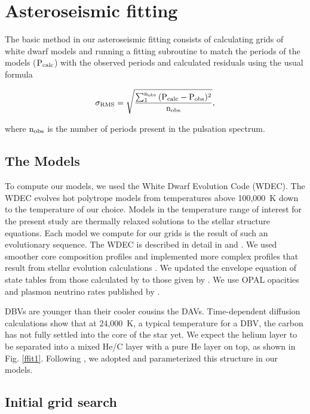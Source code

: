 \documentclass[12pt,preprint]{aastex}
\begin{document}
\section{Asteroseismic fitting}
\label{fitting}

The basic method in our asteroseismic fitting consists of calculating grids of white dwarf models and 
running a fitting subroutine to match the periods of the models ($\rm P_{calc}$) with the observed 
periods and calculated residuals using the usual formula

\begin{equation}
\label{fiteq1}
\rm \sigma_{RMS} = \sqrt{\frac{\sum_{1}^{n_{obs}} {(P_{calc}-P_{obs})^2}}{n_{obs}}},
\end{equation}

\noindent where $\rm n_{obs}$ is the number of periods present in the pulsation spectrum.

\subsection{The Models}
\label{models}

To compute our models, we used the White Dwarf Evolution Code (WDEC). The WDEC evolves hot 
polytrope models from temperatures above 100{,}000~K down to the temperature of our choice. 
Models in the temperature range of interest for the present study are thermally relaxed 
solutions to the stellar structure equations. Each model we compute for our grids is the result 
of such an evolutionary sequence. The WDEC is described in detail in \citet{Lamb75} and 
\citet{Wood90}. We used smoother core composition profiles and implemented more complex profiles 
that result from stellar evolution calculations \citep{Salaris97}. We updated the envelope 
equation of state tables from those calculated by \citet{Fontaine77} to those given by 
\citet{Saumon95}. We use OPAL opacities \citep{Iglesias96} and plasmon neutrino rates 
published by \citet{Itoh96}. 

DBVs are younger than their cooler cousins the DAVs. Time-dependent diffusion calculations 
\citep[e.g.][]{Dehner95,Althaus05} show that at 24{,}000~K, a typical temperature for a DBV, 
the carbon has not fully settled into the core of the star yet. We expect the helium layer to 
be separated into a mixed He/C layer with a pure He layer on top, as shown in Fig. \ref{ffit1}. 
Following  \citet{Metcalfe05a}, we adopted and parameterized this structure in our models. 

\subsection{Initial grid search}
\label{grids}
\end{document}
